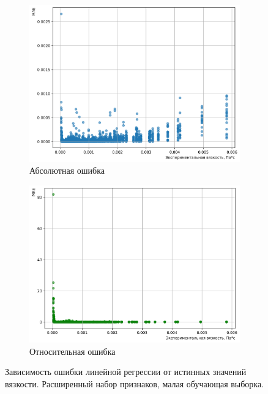 \documentclass[a4paper,12pt]{article}
\begin{document}
    \begin{figure}[ht!]
      \centering
      \begin{subfigure}{0.48\textwidth}
          \centering
          \includegraphics[width=\linewidth]{linear_regression/MAE_Linear Model_0.8_rules.png}
          \caption{Абсолютная ошибка}
      \end{subfigure}
      \hfill
      \begin{subfigure}{0.48\textwidth}
          \centering
          \includegraphics[width=\linewidth]{linear_regression/MRE_Linear Model_0.8_rules.png}
          \caption{Относительная ошибка}
      \end{subfigure}
      \caption{Зависимость ошибки линейной регрессии от истинных значений вязкости. Расширенный набор признаков, малая обучающая выборка.}
      \label{fig:linear_regression_errors_08_rules}
    \end{figure}
    
\end{document}
